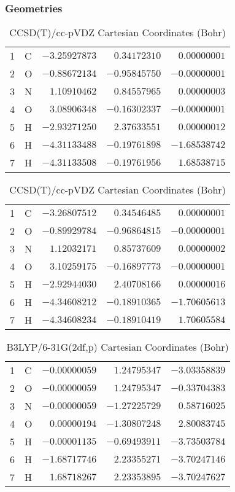 \documentclass[10pt,oneside]{article}
\begin{document}
\begin{table}[h!]
\subsubsection*{Geometries}
\begin{multicols}{2}
\centering
\caption{CCSD(T)/cc-pVTZ Cartesian Coordinates (Bohr)}
\begin{tabular}{llrrr}
\toprule
1  & C  & $-3.25927873$ & $ 0.34172310$ & $ 0.00000001$ \\
2  & O  & $-0.88672134$ & $-0.95845750$ & $-0.00000001$ \\
3  & N  & $ 1.10910462$ & $ 0.84557965$ & $ 0.00000003$ \\
4  & O  & $ 3.08906348$ & $-0.16302337$ & $-0.00000001$ \\
5  & H  & $-2.93271250$ & $ 2.37633551$ & $ 0.00000012$ \\
6  & H  & $-4.31133488$ & $-0.19761898$ & $-1.68538742$ \\
7  & H  & $-4.31133508$ & $-0.19761956$ & $ 1.68538715$ \\
\bottomrule
\end{tabular}
\caption{CCSD(T)/cc-pVDZ Cartesian Coordinates (Bohr)}
\begin{tabular}{llrrr}
\toprule
1  & C  & $-3.26807512$ & $ 0.34546485$ & $ 0.00000001$ \\
2  & O  & $-0.89929784$ & $-0.96864815$ & $-0.00000001$ \\
3  & N  & $ 1.12032171$ & $ 0.85737609$ & $ 0.00000002$ \\
4  & O  & $ 3.10259175$ & $-0.16897773$ & $-0.00000001$ \\
5  & H  & $-2.92944030$ & $ 2.40708166$ & $ 0.00000016$ \\
6  & H  & $-4.34608212$ & $-0.18910365$ & $-1.70605613$ \\
7  & H  & $-4.34608234$ & $-0.18910419$ & $ 1.70605584$ \\
\bottomrule
\end{tabular}
\end{multicols}
\end{table}

\begin{table}[h]
\centering
\caption{B3LYP/6-31G(2df,p) Cartesian Coordinates (Bohr)}
\begin{tabular}{llrrr}
\toprule
1  & C  & $-0.00000059$ & $ 1.24795347$ & $-3.03358839$ \\
2  & O  & $-0.00000059$ & $ 1.24795347$ & $-0.33704383$ \\
3  & N  & $-0.00000059$ & $-1.27225729$ & $ 0.58716025$ \\
4  & O  & $ 0.00000194$ & $-1.30807248$ & $ 2.80083745$ \\
5  & H  & $-0.00001135$ & $-0.69493911$ & $-3.73503784$ \\
6  & H  & $-1.68717746$ & $ 2.23355271$ & $-3.70247146$ \\
7  & H  & $ 1.68718267$ & $ 2.23353895$ & $-3.70247627$ \\
\bottomrule
\end{tabular}
\end{table}
\end{document}
